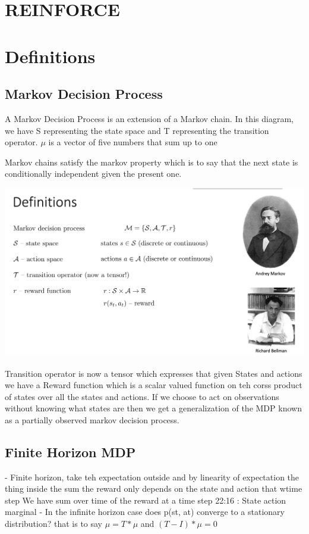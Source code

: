 \documentclass{article}
\begin{document}
\section{REINFORCE}


\section{Definitions}


\subsection{Markov Decision Process}
A Markov Decision Process is an extension of a Markov chain. In this diagram, we have S representing the state space and T representing the transition operator. $\mu$ is a vector of five numbers that sum up to one 

Markov chains satisfy the markov property which is to say that the next state is conditionally independent given the present one.

\includegraphics[scale=0.25]{mdp}

Transition operator is now a tensor which expresses that given States and actions we have a Reward function which is a scalar valued function on teh corss product of states over all the states and actions.
If we choose to act on observations without knowing what states are then we get a generalization of the MDP known as a partially observed markov decision process.


\subsection{Finite Horizon MDP}
- Finite horizon, take teh expectation outside and by linearity of expectation the thing inside the sum the reward only depends on the state and action that wtime step
We have sum over time of the reward at a time step
22:16 : State action marginal
- In the infinite horizon case does p(st, at) converge to a stationary distribution? that is to say $\mu = T * \mu$
and $(T- I) * \mu =0$
\end{document}
